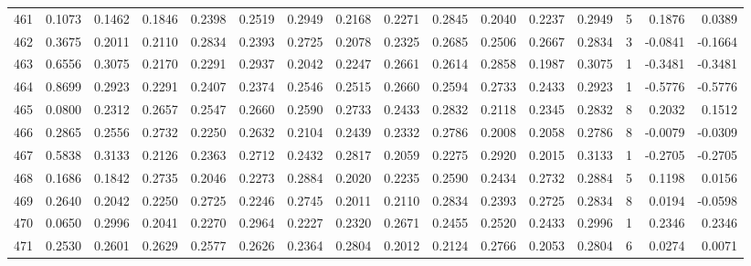 \begin{tabular}{lrrrrrrrrrrrrrrr}
461 &      0.1073 &  0.1462 &  0.1846 &  0.2398 &  0.2519 &  0.2949 &  0.2168 &  0.2271 &  0.2845 &  0.2040 &   0.2237 &     0.2949 &      5 &                    0.1876 &                     0.0389 \\
462 &      0.3675 &  0.2011 &  0.2110 &  0.2834 &  0.2393 &  0.2725 &  0.2078 &  0.2325 &  0.2685 &  0.2506 &   0.2667 &     0.2834 &      3 &                   -0.0841 &                    -0.1664 \\
463 &      0.6556 &  0.3075 &  0.2170 &  0.2291 &  0.2937 &  0.2042 &  0.2247 &  0.2661 &  0.2614 &  0.2858 &   0.1987 &     0.3075 &      1 &                   -0.3481 &                    -0.3481 \\
464 &      0.8699 &  0.2923 &  0.2291 &  0.2407 &  0.2374 &  0.2546 &  0.2515 &  0.2660 &  0.2594 &  0.2733 &   0.2433 &     0.2923 &      1 &                   -0.5776 &                    -0.5776 \\
465 &      0.0800 &  0.2312 &  0.2657 &  0.2547 &  0.2660 &  0.2590 &  0.2733 &  0.2433 &  0.2832 &  0.2118 &   0.2345 &     0.2832 &      8 &                    0.2032 &                     0.1512 \\
466 &      0.2865 &  0.2556 &  0.2732 &  0.2250 &  0.2632 &  0.2104 &  0.2439 &  0.2332 &  0.2786 &  0.2008 &   0.2058 &     0.2786 &      8 &                   -0.0079 &                    -0.0309 \\
467 &      0.5838 &  0.3133 &  0.2126 &  0.2363 &  0.2712 &  0.2432 &  0.2817 &  0.2059 &  0.2275 &  0.2920 &   0.2015 &     0.3133 &      1 &                   -0.2705 &                    -0.2705 \\
468 &      0.1686 &  0.1842 &  0.2735 &  0.2046 &  0.2273 &  0.2884 &  0.2020 &  0.2235 &  0.2590 &  0.2434 &   0.2732 &     0.2884 &      5 &                    0.1198 &                     0.0156 \\
469 &      0.2640 &  0.2042 &  0.2250 &  0.2725 &  0.2246 &  0.2745 &  0.2011 &  0.2110 &  0.2834 &  0.2393 &   0.2725 &     0.2834 &      8 &                    0.0194 &                    -0.0598 \\
470 &      0.0650 &  0.2996 &  0.2041 &  0.2270 &  0.2964 &  0.2227 &  0.2320 &  0.2671 &  0.2455 &  0.2520 &   0.2433 &     0.2996 &      1 &                    0.2346 &                     0.2346 \\
471 &      0.2530 &  0.2601 &  0.2629 &  0.2577 &  0.2626 &  0.2364 &  0.2804 &  0.2012 &  0.2124 &  0.2766 &   0.2053 &     0.2804 &      6 &                    0.0274 &                     0.0071 \\

\end{tabular}
